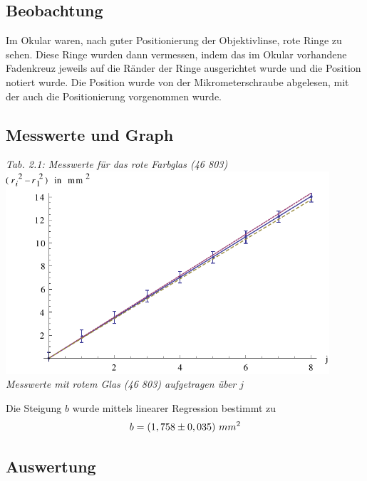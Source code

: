 \subsection{Beobachtung}
Im Okular waren, nach guter Positionierung der Objektivlinse, rote Ringe zu sehen. Diese Ringe wurden dann vermessen, indem das im Okular vorhandene Fadenkreuz jeweils auf die Ränder der Ringe ausgerichtet wurde und die Position notiert wurde. Die Position wurde von der Mikrometerschraube abgelesen, mit der auch die Positionierung vorgenommen wurde.
\subsection{Messwerte und Graph}
\begin{center}

{\it Tab. 2.1: Messwerte für das rote Farbglas (46 803)}
\includegraphics[width=12cm]{rot}
\\
{\it Messwerte mit rotem Glas (46 803) aufgetragen über \(j\)}
\end{center}
Die Steigung \(b\) wurde mittels linearer Regression bestimmt zu
\begin{equation}
b = \left( 1,758 \pm 0,035 \right)\,mm^2
\notag
\end{equation}
\subsection{Auswertung}

